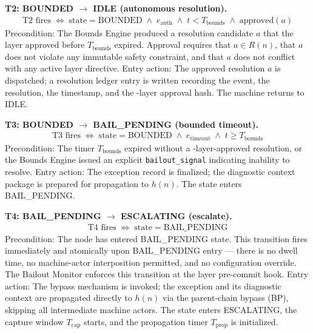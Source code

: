 \bigskip
\noindent\textbf{T2: BOUNDED $\rightarrow$ IDLE (autonomous resolution).}
\begin{align}
\text{T2 fires} \;\iff\; \text{state} = \text{BOUNDED} \;\land\; e_{\text{auth}} \;\land\; t < T_{\text{bounds}} \;\land\; \text{approved}(a) \tag{T2}
\end{align}
Precondition: The Bounds Engine produced a resolution candidate $a$ that the \fact{} layer approved before $T_{\text{bounds}}$ expired. Approval requires that $a \in R(n)$, that $a$ does not violate any immutable safety constraint, and that $a$ does not conflict with any active \purpose{} layer directive. Entry action: The approved resolution $a$ is dispatched; a resolution ledger entry is written recording the event, the resolution, the timestamp, and the \fact-layer approval hash. The machine returns to IDLE.

\bigskip
\noindent\textbf{T3: BOUNDED $\rightarrow$ BAIL\_PENDING (bounded timeout).}
\begin{align}
\text{T3 fires} \;\iff\; \text{state} = \text{BOUNDED} \;\land\; e_{\text{timeout}} \;\land\; t \geq T_{\text{bounds}} \tag{T3}
\end{align}
Precondition: The timer $T_{\text{bounds}}$ expired without a \fact-layer-approved resolution, or the Bounds Engine issued an explicit \texttt{bailout\_signal} indicating inability to resolve. Entry action: The exception record is finalized; the diagnostic context package is prepared for propagation to $h(n)$. The state enters BAIL\_PENDING.

\bigskip
\noindent\textbf{T4: BAIL\_PENDING $\rightarrow$ ESCALATING (escalate).}
\begin{align}
\text{T4 fires} \;\iff\; \text{state} = \text{BAIL\_PENDING} \tag{T4}
\end{align}
Precondition: The node has entered BAIL\_PENDING state. This transition fires immediately and atomically upon BAIL\_PENDING entry — there is no dwell time, no machine-actor interposition permitted, and no configuration override. The Bailout Monitor enforces this transition at the \fact{} layer pre-commit hook. Entry action: The bypass mechanism is invoked; the exception and its diagnostic context are propagated directly to $h(n)$ via the parent-chain bypass (BP), skipping all intermediate machine actors. The state enters ESCALATING, the capture window $T_{\text{cap}}$ starts, and the propagation timer $T_{\text{prop}}$ is initialized.

